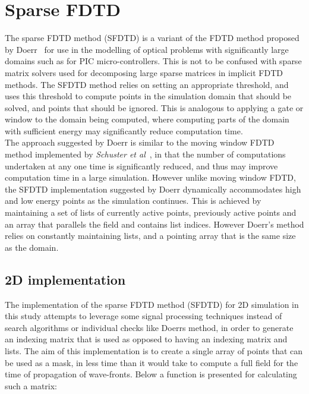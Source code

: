 %

\section{Sparse FDTD}
The sparse FDTD method (SFDTD) is a variant of the FDTD method proposed by Doerr~\cite{Doerr} for use in the modelling of optical problems with significantly large domains such as for PIC micro-controllers. This is not to be confused with sparse matrix solvers used for decomposing large sparse matrices in implicit FDTD methods. The SFDTD method relies on setting an appropriate threshold, and uses this threshold to compute points in the simulation domain that should be solved, and points that should be ignored. This is analogous to applying a gate or window to the domain being computed, where computing parts of the domain with sufficient energy may significantly reduce computation time.\\

The approach suggested by Doerr is similar to the moving window FDTD method implemented by \textit{Schuster et al}~\cite{Schuster2004}, in that the number of computations undertaken at any one time is significantly reduced, and thus may improve computation time in a large simulation. However unlike moving window FDTD, the SFDTD implementation suggested by Doerr dynamically accommodates high and low energy points as the simulation continues. This is achieved by maintaining a set of lists of currently active points, previously active points and an array that parallels the field and contains list indices. However Doerr's method relies on constantly maintaining lists, and a pointing array that is the same size as the domain.\\

\subsection{2D implementation}
The implementation of the sparse FDTD method (SFDTD) for 2D simulation in this study attempts to leverage some signal processing techniques instead of search algorithms or individual checks like Doerrs method, in order to generate an indexing matrix that is used as opposed to having an indexing matrix and lists. The aim of this implementation is to create a single array of points that can be used as a mask, in less time than it would take to compute a full field for the time of propagation of wave-fronts. Below a function is presented for calculating such a matrix:\\

